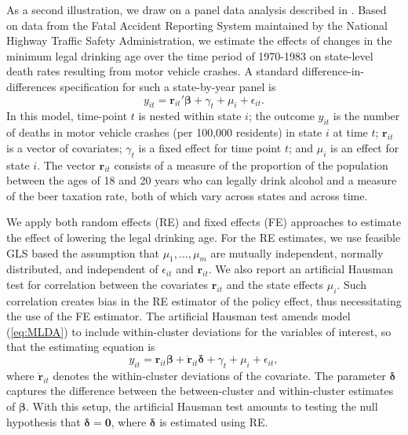 \documentclass[12pt]{article}\usepackage[]{graphicx}\usepackage[]{color}
\newcommand{\bm}{\mathbf}
\newcommand{\bs}{\boldsymbol}
\begin{document}
As a second illustration, we draw on a panel data analysis described in \citet[see also \citealp{Carpenter2011minimum}]{Angrist2014mastering}.
Based on data from the Fatal Accident Reporting System maintained by the National Highway Traffic Safety Administration, we estimate the effects of changes in the minimum legal drinking age over the time period of 1970-1983 on state-level death rates resulting from motor vehicle crashes.
A standard difference-in-differences specification for such a state-by-year panel is
\begin{equation}
\label{eq:MLDA}
y_{it} = \bm{r}_{it}'\bs\beta + \gamma_t + \mu_i + \epsilon_{it}.
\end{equation}
In this model, time-point $t$ is nested within state $i$; the outcome $y_{it}$ is the number of deaths in motor vehicle crashes (per 100,000 residents) in state $i$ at time $t$; $\bm{r}_{it}$ is a vector of covariates; $\gamma_t$ is a fixed effect for time point $t$; and $\mu_i$ is an effect for state $i$. The vector $\bm{r}_{it}$ consists of a measure of the proportion of the population between the ages of 18 and 20 years who can legally drink alcohol and a measure of the beer taxation rate, both of which vary across states and across time.

We apply both random effects (RE) and fixed effects (FE) approaches to estimate the effect of lowering the legal drinking age. 
For the RE estimates, we use feasible GLS based the assumption that  $\mu_1,...,\mu_m$ are mutually independent, normally distributed, and independent of $\epsilon_{it}$ and $\bm{r}_{it}$.
We also report an artificial Hausman test \citep{Arellano1993on, Wooldridge2010econometric} for correlation between the covariates $\bm{r}_{it}$ and the state effects $\mu_i$. Such correlation creates bias in the RE estimator of the policy effect, thus necessitating the use of the FE estimator.
The artificial Hausman test amends model (\ref{eq:MLDA}) to include within-cluster deviations for the variables of interest, so that the estimating equation is
\begin{equation}
y_{it} = \bm{r}_{it}\bs\beta + \bm{\ddot{r}}_{it}\bs\delta + \gamma_t + \mu_i + \epsilon_{it},
\end{equation}
where $\bm{\ddot{r}}_{it}$ denotes the within-cluster deviations of the covariate.
The parameter $\bs\delta$ captures the difference between the between-cluster and within-cluster estimates of $\bs\beta$. 
With this setup, the artificial Hausman test amounts to testing the null hypothesis that $\bs\delta = \bm{0}$, where $\bs\delta$ is estimated using RE.  
\end{document}
